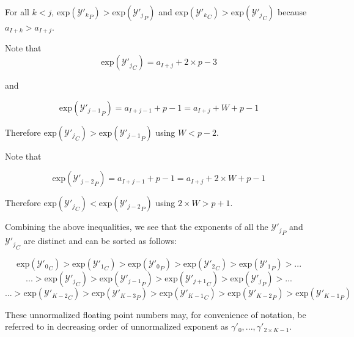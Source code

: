 \documentclass[12pt]{article}
\providecommand{\exp}{\ensuremath{\text{exp}}}
\theoremstyle{definition}
\numberwithin{equation}{section}
\numberwithin{figure}{section}
\begin{document}
    For all $k < j$, $\exp({\mathcal{Y}'_k}_P) > \exp({\mathcal{Y}'_j}_P)$ and $\exp({\mathcal{Y}'_k}_C) > \exp({\mathcal{Y}'_j}_C)$ because $a_{I + k} > a_{I + j}$.

    Note that
    \begin{equation*}
      \exp({\mathcal{Y}'_j}_C) = a_{I + j} + 2 \times p - 3
    \end{equation*}

    and

    \begin{equation*}
      \exp({\mathcal{Y}'_{j - 1}}_P) = a_{I + j - 1} + p - 1 = a_{I + j} + W + p - 1
    \end{equation*}

    Therefore $\exp({\mathcal{Y}'_j}_C) > \exp({\mathcal{Y}'_{j - 1}}_P)$ using $W < p - 2$.

    Note that

    \begin{equation*}
      \exp({\mathcal{Y}'_{j - 2}}_P) = a_{I + j - 1} + p - 1 = a_{I + j} + 2\times W + p - 1
    \end{equation*}

    Therefore $\exp({\mathcal{Y}'_j}_C) < \exp({\mathcal{Y}'_{j - 2}}_P)$ using $2 \times W > p + 1$.

    Combining the above inequalities, we see that the exponents of all the ${\mathcal{Y}'_j}_P$ and ${\mathcal{Y}'_j}_C$ are distinct and can be sorted as follows:

    \begin{equation*}
    \exp({\mathcal{Y}'_0}_C) > \exp({\mathcal{Y}'_1}_C) > \exp({\mathcal{Y}'_0}_P) > \exp({\mathcal{Y}'_2}_C) > \exp({\mathcal{Y}'_1}_P) > ...
    \end{equation*}
    \begin{equation*}
    ...> \exp({\mathcal{Y}'_j}_C) > \exp({\mathcal{Y}'_{j - 1}}_P) > \exp({\mathcal{Y}'_{j + 1}}_C) > \exp({\mathcal{Y}'_j}_P) > ...
    \end{equation*}
    \begin{equation*}
    ...> \exp({\mathcal{Y}'_{K - 2}}_C) > \exp({\mathcal{Y}'_{K - 3}}_P) > \exp({\mathcal{Y}'_{K - 1}}_C) > \exp({\mathcal{Y}'_{K - 2}}_P) > \exp({\mathcal{Y}'_{K - 1}}_P)
    \end{equation*}

    These unnormalized floating point numbers may, for convenience of notation, be referred to in decreasing order of unnormalized exponent as $\gamma'_0, ..., \gamma'_{2 \times K - 1}$.
\end{document}
